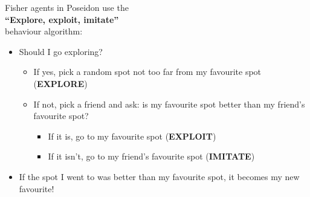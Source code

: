 \documentclass[table, 14pt, aspectratio=169]{beamer}
\newcommand{\hl}[1]{\textcolor{OxfordBlue}{\textbf{#1}}}
\begin{document}
\begin{frame}[t]
  \Large Fisher agents in Poseidon use the\\\hl{``Explore, exploit, imitate''}\\behaviour algorithm:
  \vfill
  \begin{tcolorbox}[halign=flush left]
  \begin{itemize}\small
    \item Should I go exploring?
    \begin{itemize}\small
      \item If yes, pick a random spot not too far from my favourite spot (\hl{EXPLORE})
      \item If not, pick a friend and ask: is my favourite spot better than my friend's favourite spot?
      \begin{itemize}\small
        \item If it is, go to my favourite spot (\hl{EXPLOIT})
        \item If it isn't, go to my friend's favourite spot (\hl{IMITATE})
      \end{itemize}
    \end{itemize}
    \item If the spot I went to was better than my favourite spot, it becomes my new favourite!
  \end{itemize}
  \end{tcolorbox}
\end{frame}
\end{document}
